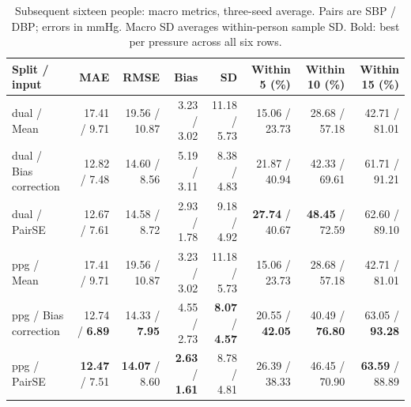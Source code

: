 \begin{table}[t]
\centering\caption{Subsequent sixteen people: macro metrics, three-seed average. Pairs are SBP / DBP; errors in mmHg. Macro SD averages within-person sample SD. Bold: best per pressure across all six rows.}\label{tab:previous_sixteen_macro}
\footnotesize
\setlength{\tabcolsep}{4pt}
\begin{tabular}{lrrrrrrr}\toprule
Split / input & MAE & RMSE & Bias & SD & Within 5 (\%) & Within 10 (\%) & Within 15 (\%)\\\midrule
dual / Mean & 17.41 / 9.71 & 19.56 / 10.87 & 3.23 / 3.02 & 11.18 / 5.73 & 15.06 / 23.73 & 28.68 / 57.18 & 42.71 / 81.01\\
dual / Bias correction & 12.82 / 7.48 & 14.60 / 8.56 & 5.19 / 3.11 & 8.38 / 4.83 & 21.87 / 40.94 & 42.33 / 69.61 & 61.71 / 91.21\\
dual / PairSE & 12.67 / 7.61 & 14.58 / 8.72 & 2.93 / 1.78 & 9.18 / 4.92 & \textbf{27.74} / 40.67 & \textbf{48.45} / 72.59 & 62.60 / 89.10\\
ppg / Mean & 17.41 / 9.71 & 19.56 / 10.87 & 3.23 / 3.02 & 11.18 / 5.73 & 15.06 / 23.73 & 28.68 / 57.18 & 42.71 / 81.01\\
ppg / Bias correction & 12.74 / \textbf{6.89} & 14.33 / \textbf{7.95} & 4.55 / 2.73 & \textbf{8.07} / \textbf{4.57} & 20.55 / \textbf{42.05} & 40.49 / \textbf{76.80} & 63.05 / \textbf{93.28}\\
ppg / PairSE & \textbf{12.47} / 7.51 & \textbf{14.07} / 8.60 & \textbf{2.63} / \textbf{1.61} & 8.78 / 4.81 & 26.39 / 38.33 & 46.45 / 70.90 & \textbf{63.59} / 88.89\\
\bottomrule\end{tabular}
\end{table}
